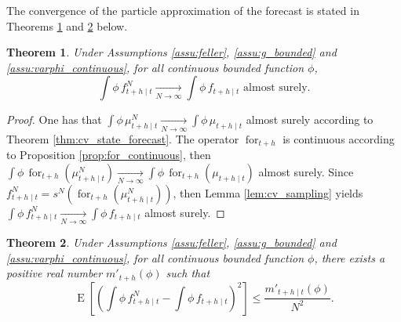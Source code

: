 \documentclass{article}
\newtheorem{thm}{Theorem}
\newcommand{\limN}{\underset{N \rightarrow \infty}{\longrightarrow}}
\DeclareMathOperator{\E}{E}
\DeclareMathOperator{\for}{for}
\begin{document}
The convergence of the particle approximation of the forecast is stated in Theorems \ref{thm:cv_forecast} and \ref{thm:cv_forecast_l2} below.

\begin{thm}\label{thm:cv_forecast}
  Under Assumptions \ref{assu:feller}, \ref{assu:g_bounded} and \ref{assu:varphi_continuous}, for all continuous bounded function $\phi$,
  $$\int \phi \, f^N_{t+h \mid t} \limN \int \phi \, f_{t+h \mid t}\text{\ \ almost surely.}$$
\end{thm}

\begin{proof}
    One has that $\displaystyle \int \phi \, \mu^N_{t+h \mid t} \limN \int \phi \, \mu_{t+h \mid t}$ almost surely according to Theorem \ref{thm:cv_state_forecast}. The operator $\for_{t+h}$ is continuous according to Proposition \ref{prop:for_continuous}, then $\displaystyle \int \phi \, \for_{t+h}(\mu^N_{t+h \mid t}) \limN \int \phi \, \for_{t+h}(\mu_{t+h \mid t})$ almost surely. Since $f^N_{t+h \mid t} = s^N(\for_{t+h}(\mu^N_{t+h \mid t}))$, then Lemma \ref{lem:cv_sampling} yields $\displaystyle \int \phi \, f^N_{t+h \mid t} \limN \int \phi \, f_{t+h \mid t}$ almost surely.
\end{proof}

\begin{thm}\label{thm:cv_forecast_l2}
    Under Assumptions \ref{assu:feller}, \ref{assu:g_bounded} and \ref{assu:varphi_continuous}, for all continuous bounded function $\phi$, there exists a positive real number $m'_{t+h}(\phi)$ such that
    $$\E[(\int \phi \, f^N_{t+h \mid t} - \int \phi \, f_{t+h \mid t})^2] \leq \frac{m'_{t+h \mid t}(\phi)}{N^2}.$$
\end{thm}
\end{document}
